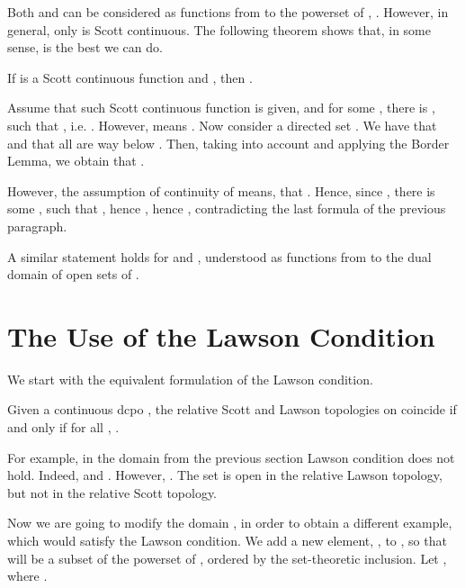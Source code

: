 Both  and  can be considered as functions from  to the
powerset of , . However, in general, only 
is Scott continuous.
The following theorem shows that, in some sense,  is the best
we can do.

\begin{theorem}
If  is a Scott continuous function
and , then
. 
\end{theorem}
\Proof
Assume that such Scott continuous function  is given,
and for some , there is , such that ,
i.e. .
However,  means . Now consider a directed
set . We have that  and that all 
are way below . Then, taking into account 
and applying the Border Lemma, we obtain that .

However, the assumption of continuity of  means, that
. Hence, since ,
there is some , such that , hence ,
hence , contradicting the last formula of the previous
paragraph.
\eproof


A similar statement holds for  and ,
understood as functions from  to the dual domain of open sets
of .

\section{The Use of the Lawson Condition}\label{sec:lawson}

We start with the equivalent formulation of the Lawson condition.

\begin{Lemma} Given a continuous dcpo , the relative Scott and Lawson
topologies on  coincide if and only if for all ,
.
\end{Lemma}

For example, in the domain  from the previous section
Lawson condition does not hold. Indeed,
 and .  
However, . 
The set  is open in the
relative Lawson topology, but not in the relative Scott topology.

Now we are going to modify the domain , in order to obtain a
different example, which would satisfy the Lawson condition.
We add a new element, , to , so that  will be
a subset of the powerset of , ordered by
the set-theoretic inclusion. Let ,
where .

